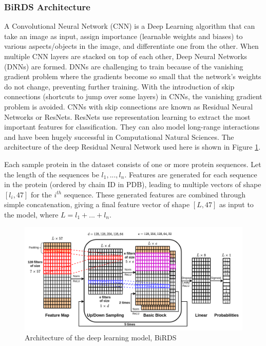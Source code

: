 \documentclass[journal=jcisd8,manuscript=article]{achemso}
\begin{document}
\subsubsection{BiRDS Architecture}
\label{birds_architecture}
\quad A Convolutional Neural Network (CNN) is a Deep Learning algorithm that can take an image as input, assign importance (learnable weights and biases) to various aspects/objects in the image, and differentiate one from the other. When multiple CNN layers are stacked on top of each other, Deep Neural Networks (DNNs) are formed. DNNs are challenging to train because of the vanishing gradient problem where the gradients become so small that the network's weights do not change, preventing further training. With the introduction of skip connections (shortcuts to jump over some layers) in CNNs, the vanishing gradient problem is avoided. CNNs with skip connections are known as Residual Neural Networks or ResNets\cite{he2016deep}. ResNets use representation learning to extract the most important features for classification. They can also model long-range interactions and have been hugely successful in Computational Natural Sciences\cite{senior2020improved}. The architecture of the deep Residual Neural Network used here is shown in Figure \ref{fig:architecture}.

Each sample protein in the dataset consists of one or more protein sequences. Let the length of the sequences be $l_1, ..., l_n$. Features are generated for each sequence in the protein (ordered by chain ID in PDB), leading to multiple vectors of shape $[l_i, 47]$ for the $i^{th}$ sequence. These generated features are combined through simple concatenation, giving a final feature vector of shape $[L, 47]$ as input to the model, where $L = l_1 + ... + l_n$.

\begin{figure}
    \centering
    \noindent\includegraphics[scale=0.5]{architecture}
    \caption{\centering Architecture of the deep learning model, BiRDS}
    \label{fig:architecture}
\end{figure}
\end{document}
